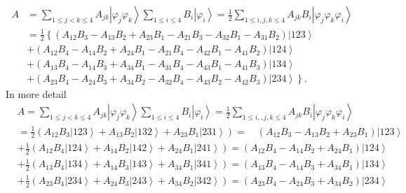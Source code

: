 \documentclass[aps,preprint]{revtex4}%
\begin{document}
\begin{align}
A &  =\sum_{1\leq j<k\leq4}A_{jk}\left\vert \varphi_{j}\varphi_{k}%
\right\rangle \sum_{1\leq i\leq4}B_{i}\left\vert \varphi_{i}\right\rangle
=\frac{1}{2}\sum_{1\leq i,j,k\leq4}A_{jk}B_{i}\left\vert \varphi_{j}%
\varphi_{k}\varphi_{i}\right\rangle \nonumber\\
&  =\frac{1}{2}\left\{  \left(  A_{12}B_{3}-A_{13}B_{2}+A_{23}B_{1}%
-A_{21}B_{3}-A_{32}B_{1}-A_{31}B_{2}\right)  \left\vert 123\right\rangle
\right.  \nonumber\\
&  +\left(  A_{12}B_{4}-A_{14}B_{2}+A_{24}B_{1}-A_{21}B_{4}-A_{42}B_{1}%
-A_{41}B_{2}\right)  \left\vert 124\right\rangle \nonumber\\
&  +\left(  A_{13}B_{4}-A_{14}B_{3}+A_{34}B_{1}-A_{31}B_{4}-A_{43}B_{1}%
-A_{41}B_{3}\right)  \left\vert 134\right\rangle \nonumber\\
&  \left.  +\left(  A_{23}B_{4}-A_{24}B_{3}+A_{34}B_{2}-A_{32}B_{4}%
-A_{43}B_{2}-A_{42}B_{3}\right)  \left\vert 234\right\rangle \right\}  .
\end{align}
In more detail%
\begin{align}
&  A=\sum_{1\leq j<k\leq4}A_{jk}\left\vert \varphi_{j}\varphi_{k}\right\rangle
\sum_{1\leq i\leq4}B_{i}\left\vert \varphi_{i}\right\rangle =\frac{1}{2}%
\sum_{1\leq i,,j,k\leq4}A_{jk}B_{i}\left\vert \varphi_{j}\varphi_{k}%
\varphi_{i}\right\rangle \nonumber\\
&  =\frac{1}{2}\left(  A_{12}B_{3}\left\vert 123\right\rangle +A_{13}%
B_{2}\left\vert 132\right\rangle +A_{23}B_{1}\left\vert 231\right\rangle
\right)  =\quad\left(  A_{12}B_{3}-A_{13}B_{2}+A_{23}B_{1}\right)  \left\vert
123\right\rangle \nonumber\\
&  \left.  +\right.  \frac{1}{2}\left(  A_{12}B_{4}\left\vert 124\right\rangle
+A_{14}B_{2}\left\vert 142\right\rangle +A_{24}B_{1}\left\vert
241\right\rangle \right)  =\left(  A_{12}B_{4}-A_{14}B_{2}+A_{24}B_{1}\right)
\left\vert 124\right\rangle \nonumber\\
&  \left.  +\right.  \frac{1}{2}\left(  A_{13}B_{4}\left\vert 134\right\rangle
+A_{14}B_{3}\left\vert 143\right\rangle +A_{34}B_{1}\left\vert
341\right\rangle \right)  =\left(  A_{13}B_{4}-A_{14}B_{3}+A_{34}B_{1}\right)
\left\vert 134\right\rangle \nonumber\\
&  \left.  +\right.  \frac{1}{2}\left(  A_{23}B_{4}\left\vert 234\right\rangle
+A_{24}B_{3}\left\vert 243\right\rangle +A_{34}B_{2}\left\vert
342\right\rangle \right)  =\left(  A_{23}B_{4}-A_{24}B_{3}+A_{34}B_{2}\right)
\left\vert 234\right\rangle
\end{align}
\end{document}

